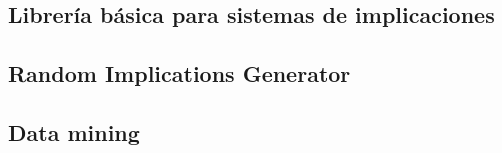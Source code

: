 \subsection{Librer\'ia b\'asica para sistemas de implicaciones}


\subsection{Random Implications Generator}


\subsection{Data mining}




\newpage
\thispagestyle{empty}
\mbox{}

\newpage